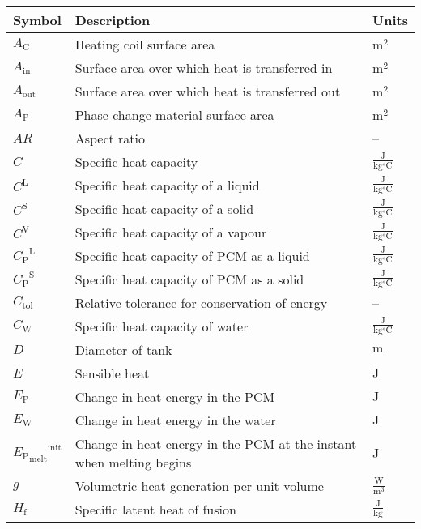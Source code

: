 \documentclass[12pt]{article}
\begin{document}
\begin{longtabu}{l X[l] l}
\toprule
\textbf{Symbol} & \textbf{Description} & \textbf{Units}
\\
\midrule
\endhead
${A_{\text{C}}}$ & Heating coil surface area & ${\text{m}^{2}}$
\\
${A_{\text{in}}}$ & Surface area over which heat is transferred in & ${\text{m}^{2}}$
\\
${A_{\text{out}}}$ & Surface area over which heat is transferred out & ${\text{m}^{2}}$
\\
${A_{\text{P}}}$ & Phase change material surface area & ${\text{m}^{2}}$
\\
$AR$ & Aspect ratio & --
\\
$C$ & Specific heat capacity & $\frac{\text{J}}{\text{kg}{}^{\circ}\text{C}}$
\\
${C^{\text{L}}}$ & Specific heat capacity of a liquid & $\frac{\text{J}}{\text{kg}{}^{\circ}\text{C}}$
\\
${C^{\text{S}}}$ & Specific heat capacity of a solid & $\frac{\text{J}}{\text{kg}{}^{\circ}\text{C}}$
\\
${C^{\text{V}}}$ & Specific heat capacity of a vapour & $\frac{\text{J}}{\text{kg}{}^{\circ}\text{C}}$
\\
${{C_{\text{P}}}^{\text{L}}}$ & Specific heat capacity of PCM as a liquid & $\frac{\text{J}}{\text{kg}{}^{\circ}\text{C}}$
\\
${{C_{\text{P}}}^{\text{S}}}$ & Specific heat capacity of PCM as a solid & $\frac{\text{J}}{\text{kg}{}^{\circ}\text{C}}$
\\
${C_{\text{tol}}}$ & Relative tolerance for conservation of energy & --
\\
${C_{\text{W}}}$ & Specific heat capacity of water & $\frac{\text{J}}{\text{kg}{}^{\circ}\text{C}}$
\\
$D$ & Diameter of tank & ${\text{m}}$
\\
$E$ & Sensible heat & ${\text{J}}$
\\
${E_{\text{P}}}$ & Change in heat energy in the PCM & ${\text{J}}$
\\
${E_{\text{W}}}$ & Change in heat energy in the water & ${\text{J}}$
\\
${{{E_{\text{P}}}_{\text{melt}}}^{\text{init}}}$ & Change in heat energy in the PCM at the instant when melting begins & ${\text{J}}$
\\
$g$ & Volumetric heat generation per unit volume & $\frac{\text{W}}{\text{m}^{3}}$
\\
${H_{\text{f}}}$ & Specific latent heat of fusion & $\frac{\text{J}}{\text{kg}}$

\end{longtabu}
\end{document}
